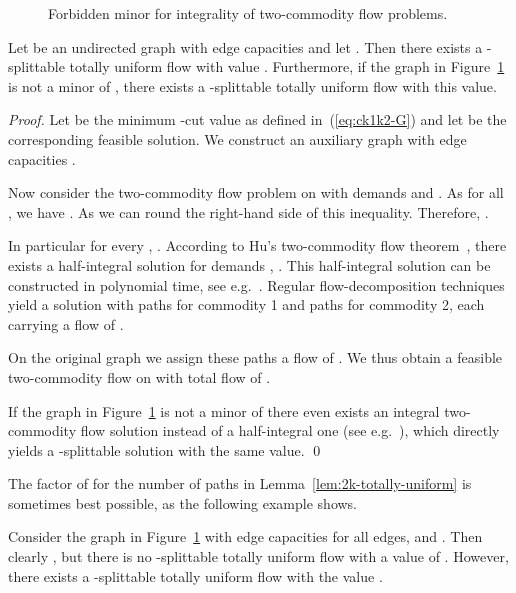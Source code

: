 \begin{figure}
  \centering
  \caption{Forbidden minor for integrality of two-commodity flow problems.}
  \label{fig:bad-minor}
\end{figure}
\begin{lemma}\label{lem:2k-totally-uniform}
  Let  be an undirected graph with edge capacities
   and let . Then there exists a -splittable totally uniform
  flow with value . Furthermore, if the graph
  in Figure~\ref{fig:bad-minor} is not a minor of , there exists a
  -splittable totally uniform flow with this value.
\end{lemma}
\begin{proof}
  Let  be the minimum -cut value as defined
  in~(\ref{eq:ck1k2-G}) and let  be the 
  corresponding feasible solution.  We construct an auxiliary graph 
  with edge capacities .

  Now
  consider the two-commodity flow problem on  with demands
   and . As  for all ,
  we have . As  we
  can round the right-hand side of this inequality. Therefore,
  . 
  
  In particular for every , .  According to Hu's
  two-commodity flow theorem~\cite{hu:63}, there exists a
  half-integral solution for demands , .  This
  half-integral solution can be constructed in polynomial time, see
  e.g.~\cite[Theorem 71.1b]{Schrijver:03:CoOptC}. Regular
  flow-decomposition techniques yield a solution with  paths for
  commodity 1 and  paths for commodity 2, each carrying a flow
  of .
  
  On the original graph  we assign these paths a flow of
  . We thus obtain a feasible two-commodity flow on 
  with total flow of . 

  If the graph in Figure~\ref{fig:bad-minor} is not a minor of  
  there even exists an integral two-commodity flow solution instead of a
  half-integral one (see e.g.~\cite[Theorem 71.2]{Schrijver:03:CoOptC}),
  which directly yields a -splittable solution with the 
  same value.
\qed \end{proof}

The factor of  for the number of paths in
Lemma~\ref{lem:2k-totally-uniform} is sometimes best possible, as the
following example shows.
\begin{example}
  Consider the graph in Figure~\ref{fig:bad-minor} with edge
  capacities  for all edges, and . Then clearly
  , but there is no -splittable totally uniform
  flow with a value of . However,
  there exists a -splittable totally uniform flow with the value
  .
\end{example}

